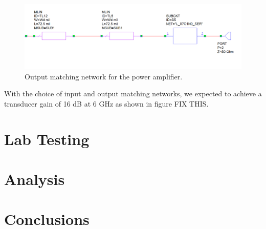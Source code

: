 \documentclass[twocolumn, aps, floatfix]{revtex4-1}
\begin{document}
\begin{figure}
    \centering
    \includegraphics[scale=0.4]{output_matching_network.png}
    \caption{Output matching network for the power amplifier.}
    \label{fig:inputmatch}
\end{figure}

With the choice of input and output matching networks, we expected to achieve a transducer gain of 16 dB at 6 GHz as shown in figure FIX THIS.

\section*{Lab Testing}\label{sec:testing}


\section*{Analysis}\label{sec:analysis}


\section*{Conclusions}
\end{document}
